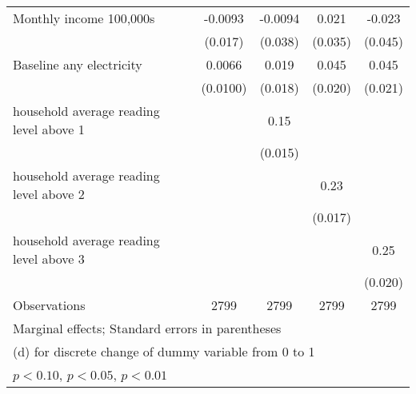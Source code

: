 \begin{table}[htbp]
\begin{tabular*}{1\hsize}{@{\hskip\tabcolsep\extracolsep\fill}l*{4}{c}}
Monthly income 100,000s&  -0.0093         &  -0.0094         &    0.021         &   -0.023         \\
                &  (0.017)         &  (0.038)         &  (0.035)         &  (0.045)         \\
Baseline any electricity&   0.0066         &    0.019         &    0.045\sym{**} &    0.045\sym{**} \\
                & (0.0100)         &  (0.018)         &  (0.020)         &  (0.021)         \\
household average reading level above 1&                  &     0.15\sym{***}&                  &                  \\
                &                  &  (0.015)         &                  &                  \\
household average reading level above 2&                  &                  &     0.23\sym{***}&                  \\
                &                  &                  &  (0.017)         &                  \\
household average reading level above 3&                  &                  &                  &     0.25\sym{***}\\
                &                  &                  &                  &  (0.020)         \\
\midrule
Observations    &     2799         &     2799         &     2799         &     2799         \\
\bottomrule
\multicolumn{5}{l}{\footnotesize Marginal effects; Standard errors in parentheses}\\
\multicolumn{5}{l}{\footnotesize  (d) for discrete change of dummy variable from 0 to 1}\\
\multicolumn{5}{l}{\footnotesize \sym{*} \(p<0.10\), \sym{**} \(p<0.05\), \sym{***} \(p<0.01\)}\\
\end{tabular*}
\end{table}
